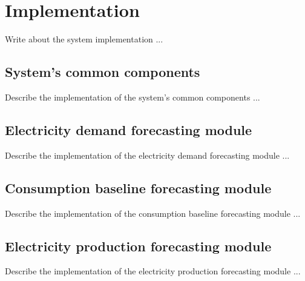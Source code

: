 \chapter{Implementation}
\label{cha:implementation}
\vspace{0.4 cm}

Write about the system implementation ...


\section{System's common components}
\label{sec:componentsimpl}
\vspace{0.2 cm}

Describe the implementation of the system's common components ...


\section{Electricity demand forecasting module}
\label{sec:demandimpl}
\vspace{0.2 cm}

Describe the implementation of the electricity demand forecasting module ...


\section{Consumption baseline forecasting module}
\label{sec:baselineimpl}
\vspace{0.2 cm}

Describe the implementation of the consumption baseline forecasting module ...


\section{Electricity production forecasting module}
\label{sec:productionimpl}
\vspace{0.2 cm}

Describe the implementation of the electricity production forecasting module ...
